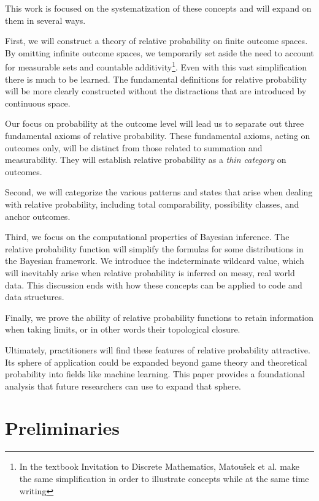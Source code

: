\documentclass[twoside]{article}
\theoremstyle{plain}%
\theoremstyle{definition}
\theoremstyle{remark}
\begin{document}
This work is focused on the systematization of these concepts and will expand on them in several ways.

First, we will construct a theory of relative probability on finite outcome spaces. By omitting infinite outcome spaces, we temporarily set aside the need to account for measurable sets and countable additivity\footnote{In the textbook Invitation to Discrete Mathematics\cite{discrete}, Matoušek et al. make the same simplification in order to illustrate concepts while at the same time writing }. Even with this vast simplification there is much to be learned. The fundamental definitions for relative probability will be more clearly constructed without the distractions that are introduced by continuous space.

Our focus on probability at the outcome level will lead us to separate out three fundamental axioms of relative probability. These fundamental axioms, acting on outcomes only, will be distinct from those related to summation and measurability. They will establish relative probability as a \textit{thin category} on outcomes.

Second, we will categorize the various patterns and states that arise when dealing with relative probability, including total comparability, possibility classes, and anchor outcomes. 

Third, we focus on the computational properties of Bayesian inference. The relative probability function will simplify the formulas for some distributions in the Bayesian framework. We introduce the indeterminate wildcard value, which will inevitably arise when relative probability is inferred on messy, real world data. This discussion ends with how these concepts can be applied to code and data structures.

Finally, we prove the ability of relative probability functions to retain information when taking limits, or in other words their topological closure.

Ultimately, practitioners will find these features of relative probability attractive. Its sphere of application could be expanded beyond game theory and theoretical probability into fields like machine learning. This paper provides a foundational analysis that future researchers can use to expand that sphere.

\section{Preliminaries}
\end{document}
